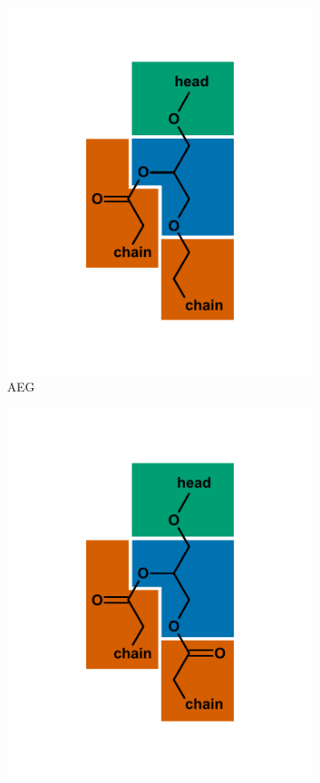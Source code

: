 \begin{figure}[h]
\begin{subfigure}[b]{.3\linewidth}
    	\includegraphics[width=1\linewidth]{figs_ch1/AEG}
    	\caption{AEG}
        \label{fig:AEG}
    \end{subfigure}
    \begin{subfigure}[b]{.3\linewidth}
        	\includegraphics[width=\linewidth]{figs_ch1/DAG}

\end{subfigure}
\end{figure}
